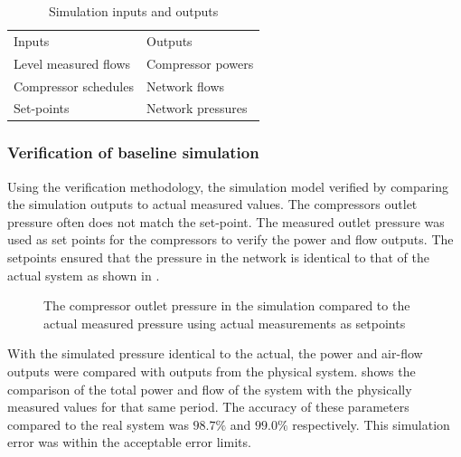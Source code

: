 \begin{table}[h!]
	\centering
	\begin{tabular}{ll}
		\hline 
		Inputs \hspace*{4cm} & Outputs \hspace*{4cm} \\ \hhline{==}
		Level measured flows & Compressor powers \\
		Compressor schedules & Network flows \\
		Set-points & Network pressures \\
		\hline
	\end{tabular}
		\caption{Simulation inputs and outputs}
\label{table: Mine B inputs/outputs}
\end{table}
	
	\subsubsection{Verification of baseline simulation}
	Using the verification methodology, the simulation model verified by comparing the simulation outputs to actual measured values. The compressors outlet pressure often does not match the set-point. The measured outlet pressure was used as set points for the compressors to verify the power and flow outputs. The setpoints ensured that the pressure in the network is identical to that of the actual system as shown in .
	\par 
	\begin{figure}[h!]
		\centering
		
		\caption{The compressor outlet pressure in the simulation compared to the actual measured pressure using actual measurements as setpoints}
		\label{fig: Verification Pressure kusasalethu}
	\end{figure}

 With the simulated pressure identical to the actual, the power and air-flow outputs were compared with outputs from the physical system.  shows the comparison of the total power and flow of the system with the physically measured values for that same period. The accuracy of these parameters compared to the real system was $98.7 \%$ and $99.0 \%$ respectively. This simulation error was within the acceptable error limits.
 
